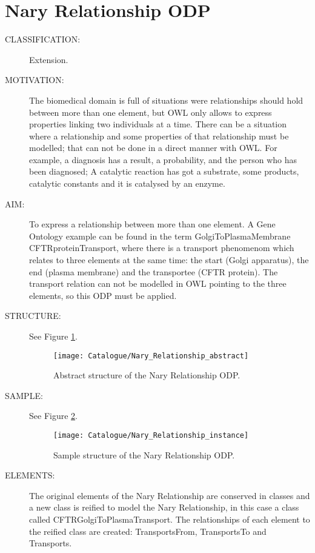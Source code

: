  \section{Nary Relationship ODP}\begin{description}
\item [CLASSIFICATION:] Extension.

\item [MOTIVATION:] The biomedical domain is full of situations were relationships should hold between more than one element, but OWL only allows to express properties linking two individuals at a time. There can be a situation where a relationship and some properties of that relationship must be modelled; that can not be done in a direct manner with OWL. For example, a diagnosis has a result, a probability, and the person who has been diagnosed; A catalytic reaction has got a substrate, some products, catalytic constants and it is catalysed by an enzyme.

\item [AIM:] To express a relationship between more than one element. A Gene Ontology example can be found in the term GolgiToPlasmaMembrane CFTRproteinTransport, where there is a transport phenomenom which relates to three elements at the same time: the start (Golgi apparatus), the end (plasma membrane) and the transportee (CFTR protein). The transport relation can not be modelled in OWL pointing to the three elements, so this ODP must be applied.

\item [STRUCTURE:] See Figure \ref{odp:Nary_Relationship_abstract}.
\begin{figure}[]\centering\texttt{[image: Catalogue/Nary\_Relationship\_abstract]}\caption{\label{odp:Nary_Relationship_abstract} Abstract structure of the Nary Relationship ODP.}\end{figure}

\item [SAMPLE:] See Figure \ref{odp:Nary_Relationship_instance}.
\begin{figure}[]\centering\texttt{[image: Catalogue/Nary\_Relationship\_instance]}\caption{\label{odp:Nary_Relationship_instance} Sample structure of the Nary Relationship ODP.}\end{figure}

\item [ELEMENTS:] The original elements of the Nary Relationship are conserved in classes and a new class is reified to model the Nary Relationship, in this case a class called CFTRGolgiToPlasmaTransport. The relationships of each element to the reified class are created: TransportsFrom, TransportsTo and Transports.


\end{description}
